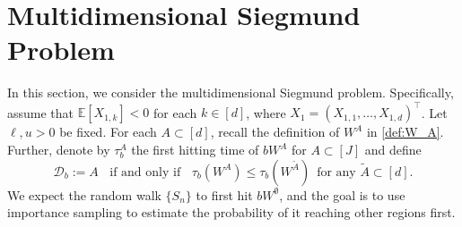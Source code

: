 \documentclass[aap,preprint]{imsart}
\newcommand{\Pro}{{\mathbb{P}}}
\newcommand{\Exp}{{\mathbb{E}}}
\newcommand{\bR}{{\mathbb{R}}}
\theoremstyle{plain}
\newtheorem{remark}{Remark}[section]
\theoremstyle{definition}
\begin{document}



\section{Multidimensional Siegmund Problem}\label{sec:multi_Siegmund}
In this section, we consider the multidimensional Siegmund problem.  Specifically, assume that $\Exp[X_{1,k}] < 0$ for each $k \in [d]$, where $X_1 = (X_{1,1},\ldots,X_{1,d})^\top$. Let $\ell,u > 0$ be fixed. For each $A \subset [d]$, recall the definition of $W^A$ in \eqref{def:W_A}.  
Further, denote by $\tau^{A}_{b}$ the first hitting time of $bW^{A}$ for $A \subset [J]$ and define
$$
\mathcal{D}_b  :=  A \;\;\text{ if and only if }\;\; \tau_b(W^{A}) \leq \tau_b(W^{\tilde{A}})\, \text{ for any } \tilde{A} \subset [d]. 
$$
We expect the random walk $\{S_n\}$ to first hit $b W^{\emptyset}$, and the goal is to use importance sampling to estimate the probability of it reaching other regions first.
\end{document}
